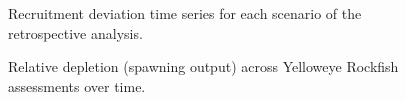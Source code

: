 \documentclass[
]{scrartcl}
\begin{document}
\begin{figure}


\caption{\label{fig-retro-recruit-dev}Recruitment deviation time series
for each scenario of the retrospective analysis.}

\end{figure}%

\begin{figure}


\caption{\label{fig-status_assmnts}Relative depletion (spawning output)
across Yelloweye Rockfish assessments over time.}

\end{figure}%
\end{document}
